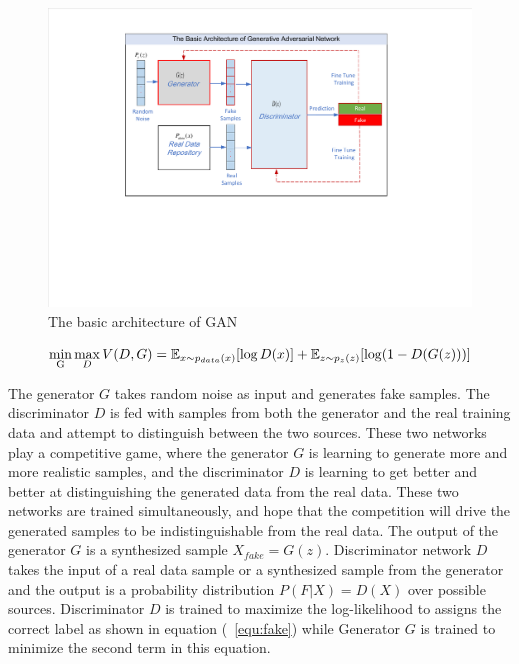 \documentclass[letterpaper,12pt]{article}
\begin{document}
\begin{figure}[!t]
	\centering
	\includegraphics[width=6 in]{figures/Fig_1_basicGAN}
	\caption{The basic architecture of GAN}
	\label{fig:basicGAN}
\end{figure}

\begin{equation}
	\mathop {\min }\limits_{\rm{G}} \mathop {\max }\limits_D V(D,G) = \mathbb{E}_{x\sim{p_{data}}(x)}[\log D(x)] + {\mathbb{E}_{z\sim{p_z}(z)}}[\log (1 - D(G(z)))]
	\label{equ:GAN}
\end{equation}

The generator $G$ takes random noise as input and generates fake samples. The discriminator $D$ is fed with samples from both the generator and the real training data and attempt to distinguish between the two sources. These two networks play a competitive game, where the generator $G$ is learning to generate more and more realistic samples, and the discriminator $D$ is learning to get better and better at distinguishing the generated data from the real data. These two networks are trained simultaneously, and hope that the competition will drive the generated samples to be indistinguishable from the real data. The output of the generator $G$ is a synthesized sample $X_{fake} = G(z)$. Discriminator network $D$ takes the input of a real data sample or a synthesized sample from the generator and the output is a probability distribution $P(F|X) = D(X)$ over possible sources. Discriminator $D$ is trained to maximize the log-likelihood to assigns the correct label as shown in equation (~\ref{equ:fake}) while Generator $G$ is trained to minimize the second term in this equation.
\end{document}

